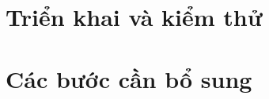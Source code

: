 \par{}
\section{Triển khai và kiểm thử}\label{section:reproducibility-8}

\par{}
\section{Các bước cần bổ sung}\label{section:reproducibility-9}


